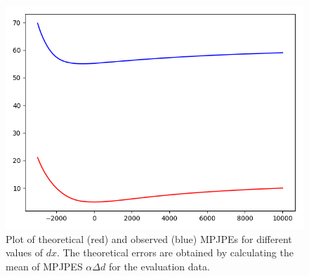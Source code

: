 \begin{figure}[ht]	
	\centering
	\includegraphics[scale=0.5]{figures/plot_e_03_07_original_z_offset.png}
	\caption{Plot of theoretical (red) and observed (blue) MPJPEs for different values of $dx$. 
		The theoretical errors are obtained by calculating the mean of MPJPES $\alpha \Delta d$ for the evaluation data.}
	\label{fig:z-shift-error}
\end{figure}